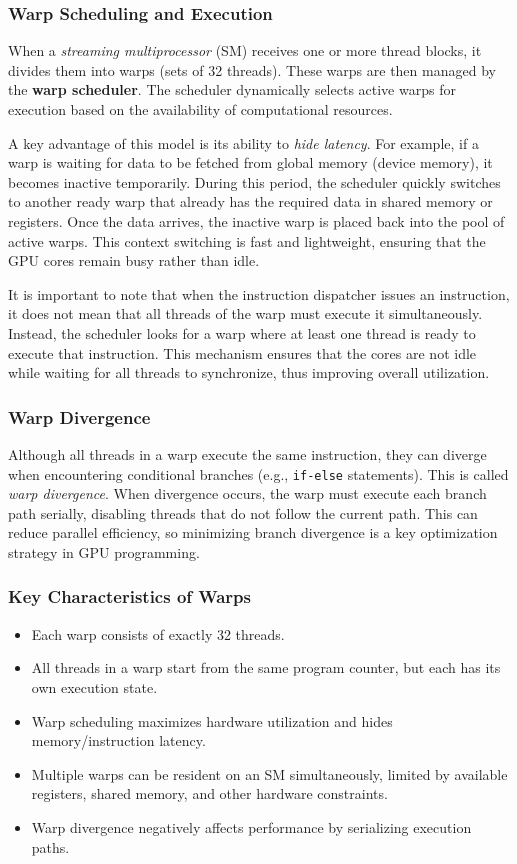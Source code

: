 \documentclass[12pt]{book}
\begin{document}
\subsubsection*{Warp Scheduling and Execution}
When a \textit{streaming multiprocessor} (SM) receives one or more thread blocks, it divides them into warps (sets of 32 threads). These warps are then managed by the \textbf{warp scheduler}. The scheduler dynamically selects active warps for execution based on the availability of computational resources.

A key advantage of this model is its ability to \textit{hide latency}. For example, if a warp is waiting for data to be fetched from global memory (device memory), it becomes inactive temporarily. During this period, the scheduler quickly switches to another ready warp that already has the required data in shared memory or registers. Once the data arrives, the inactive warp is placed back into the pool of active warps. This context switching is fast and lightweight, ensuring that the GPU cores remain busy rather than idle.

It is important to note that when the instruction dispatcher issues an instruction, it does not mean that all threads of the warp must execute it simultaneously. Instead, the scheduler looks for a warp where at least one thread is ready to execute that instruction. This mechanism ensures that the cores are not idle while waiting for all threads to synchronize, thus improving overall utilization.

\subsubsection*{Warp Divergence}
Although all threads in a warp execute the same instruction, they can diverge when encountering conditional branches (e.g., \texttt{if-else} statements). This is called \textit{warp divergence}. When divergence occurs, the warp must execute each branch path serially, disabling threads that do not follow the current path. This can reduce parallel efficiency, so minimizing branch divergence is a key optimization strategy in GPU programming.

\subsubsection*{Key Characteristics of Warps}
\begin{itemize}
    \item Each warp consists of exactly 32 threads.
    \item All threads in a warp start from the same program counter, but each has its own execution state.
    \item Warp scheduling maximizes hardware utilization and hides memory/instruction latency.
    \item Multiple warps can be resident on an SM simultaneously, limited by available registers, shared memory, and other hardware constraints.
    \item Warp divergence negatively affects performance by serializing execution paths.
\end{itemize}
\end{document}
